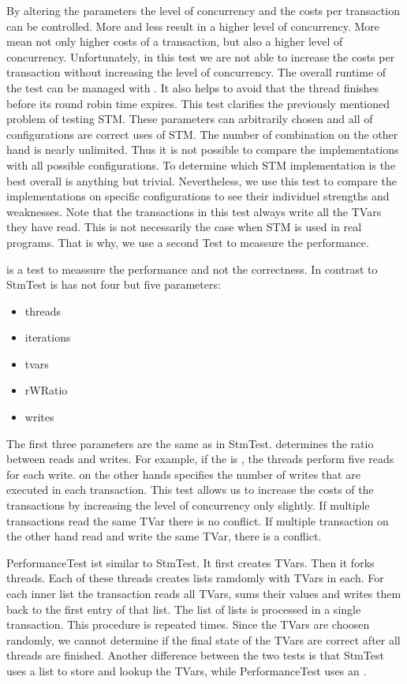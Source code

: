By altering the parameters the level of concurrency and the costs per transaction can be controlled. More  and less 
 result in a higher level of concurrency. More  mean not only higher costs of a transaction, but also
a higher level of concurrency. Unfortunately, in this test we are not able to increase the costs per transaction without increasing
the level of concurrency. The overall runtime of the test can be managed with . It also helps to avoid that the thread
finishes before its round robin time expires. This test clarifies the previously mentioned problem of testing STM. These parameters can 
arbitrarily chosen and all of configurations are correct uses of STM. The number of combination on the other hand is nearly unlimited. Thus 
it is not possible to compare the implementations with all possible configurations. To determine which STM implementation is the best overall 
is anything but trivial.
Nevertheless, we use this test to compare the implementations on specific configurations to see their individuel strengths and weaknesses.
Note that the transactions in this test always write all the TVars they have read. This is not necessarily the case when STM is used in real programs. 
That is why, we use a second Test to meassure the performance.

 is a test to meassure the performance and not the correctness. In contrast to StmTest is has not four but
five parameters:
\begin{itemize}
 \item threads
 \item iterations
 \item tvars
 \item rWRatio
 \item writes
\end{itemize}
The first three parameters are the same as in StmTest.  determines the ratio between reads and writes. For example, if
the  is , the threads perform five reads for each write.  on the other hands specifies
the number of writes that are executed in each transaction. This test allows us to increase the costs of the transactions by 
increasing the level of concurrency only slightly. If multiple transactions read the same TVar there is no conflict. If multiple
transaction on the other hand read and write the same TVar, there is a conflict. 

PerformanceTest ist similar to StmTest. It first creates  TVars. Then it forks  threads. Each of these 
threads creates  lists ramdomly with  TVars in each. For each inner list the transaction reads all TVars,
sums their values and writes them back to the first entry of that list. The list of lists is processed in a single transaction. 
This procedure is repeated  times. Since the TVars are choosen randomly, we cannot determine if the final state
of the TVars are correct after all threads are finished. Another difference between the two tests is that StmTest uses a list to 
store and lookup the TVars, while PerformanceTest uses an .

